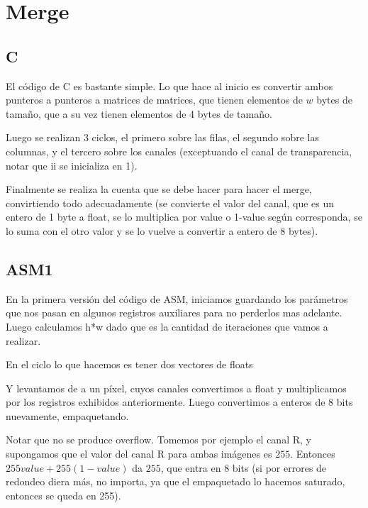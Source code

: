 \section{Merge}

\subsection{C}
El código de C es bastante simple. Lo que hace al inicio es convertir ambos punteros a punteros a matrices de matrices, que tienen elementos de $w$ bytes de tamaño, que a su vez tienen elementos de 4 bytes de tamaño.

Luego se realizan 3 ciclos, el primero sobre las filas, el segundo sobre las columnas, y el tercero sobre los canales (exceptuando el canal de transparencia, notar que ii se inicializa en 1).

Finalmente se realiza la cuenta que se debe hacer para hacer el merge, convirtiendo todo adecuadamente (se convierte el valor del canal, que es un entero de 1 byte a float, se lo multiplica por value o 1-value según corresponda, se lo suma con el otro valor y se lo vuelve a convertir a entero de 8 bytes).

\subsection{ASM1}

En la primera versión del código de ASM, iniciamos guardando los parámetros que nos pasan en algunos registros auxiliares para no perderlos mas adelante.
Luego calculamos h*w dado que es la cantidad de iteraciones que vamos a realizar.

En el ciclo lo que hacemos es tener dos vectores de floats



Y levantamos de a un píxel, cuyos canales convertimos a float y multiplicamos por los registros exhibidos anteriormente. Luego convertimos a enteros de 8 bits nuevamente, empaquetando.

Notar que no se produce overflow. Tomemos por ejemplo el canal R, y supongamos que el valor del canal R para ambas imágenes es $255$.
Entonces $255value + 255(1-value)$ da $255$, que entra en 8 bits (si por errores de redondeo diera más, no importa, ya que el empaquetado lo hacemos saturado, entonces se queda en 255).

